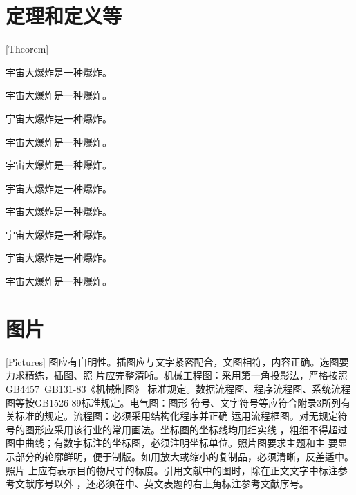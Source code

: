 \section{定理和定义等}[Theorem]
\begin{theorem}
  宇宙大爆炸是一种爆炸。
\end{theorem}
\begin{definition}[（霍金）]
  宇宙大爆炸是一种爆炸。
\end{definition}
\begin{assumption}
  宇宙大爆炸是一种爆炸。
\end{assumption}
\begin{lemma}
  宇宙大爆炸是一种爆炸。
\end{lemma}
\begin{corollary}
  宇宙大爆炸是一种爆炸。
\end{corollary}
\begin{exercise}
  宇宙大爆炸是一种爆炸。
\end{exercise}
\begin{problem}
宇宙大爆炸是一种爆炸。
\end{problem}
\begin{remark}
  宇宙大爆炸是一种爆炸。
\end{remark}
\begin{axiom}[（爱因斯坦）]
  宇宙大爆炸是一种爆炸。
\end{axiom}
\begin{conjecture}
  宇宙大爆炸是一种爆炸。
\end{conjecture}
\section{图片}[Pictures]
图应有自明性。插图应与文字紧密配合，文图相符，内容正确。选图要力求精练，插图、照
片应完整清晰。机械工程图：采用第一角投影法，严格按照GB4457~GB131-83《机械制图》
标准规定。数据流程图、程序流程图、系统流程图等按GB1526-89标准规定。电气图：图形
符号、文字符号等应符合附录3所列有关标准的规定。流程图：必须采用结构化程序并正确
运用流程框图。对无规定符号的图形应采用该行业的常用画法。坐标图的坐标线均用细实线
，粗细不得超过图中曲线；有数字标注的坐标图，必须注明坐标单位。照片图要求主题和主
要显示部分的轮廓鲜明，便于制版。如用放大或缩小的复制品，必须清晰，反差适中。照片
上应有表示目的物尺寸的标度。引用文献中的图时，除在正文文字中标注参考文献序号以外
，还必须在中、英文表题的右上角标注参考文献序号。

